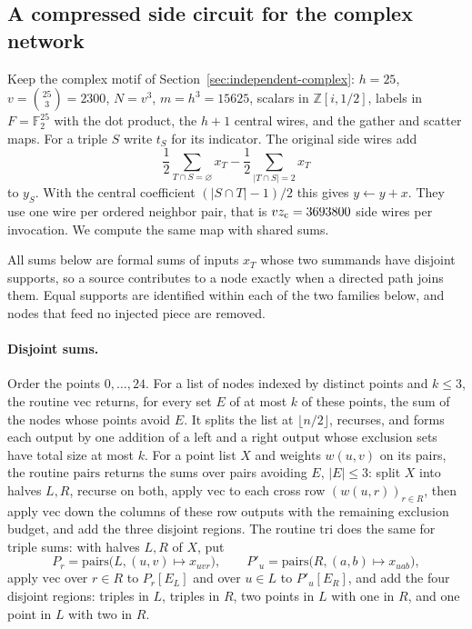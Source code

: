 \subsection{A compressed side circuit for the complex network}
\label{sec:complex-side-circuit}
Keep the complex motif of Section~\ref{sec:independent-complex}: $h=25$,
$v=\binom{25}3=2300$, $N=v^3$, $m=h^3=15625$, scalars in
$\mathbb Z[i,1/2]$, labels in $F=\mathbb F_2^{25}$ with the dot product, the
$h+1$ central wires, and the gather and scatter maps. For a triple $S$ write
$t_S$ for its indicator. The original side wires add
\begin{equation}\label{eq:complex-side-map}
 \frac12\sum_{T\cap S=\varnothing}x_T-\frac12\sum_{|T\cap S|=2}x_T
\end{equation}
to $y_S$. With the central coefficient $(|S\cap T|-1)/2$ this gives
$y\gets y+x$. They use one wire per ordered neighbor pair, that is
$vz_{\rm c}=3693800$ side wires per invocation. We compute the same map with
shared sums.

All sums below are formal sums of inputs $x_T$ whose two summands have
disjoint supports, so a source contributes to a node exactly when a directed
path joins them. Equal supports are identified within each of the two
families below, and nodes that feed no injected piece are removed.

\paragraph{Disjoint sums.}
Order the points $0,\ldots,24$. For a list of nodes indexed by distinct
points and $k\le3$, the routine $\mathrm{vec}$ returns, for every set $E$ of
at most $k$ of these points, the sum of the nodes whose points avoid $E$. It
splits the list at $\lfloor n/2\rfloor$, recurses, and forms each output by one
addition of a left and a right output whose exclusion sets have total size at
most $k$. For a point list $X$ and weights $w(u,v)$ on its pairs, the routine
$\mathrm{pairs}$ returns the sums over pairs avoiding $E$, $|E|\le3$: split $X$
into halves $L,R$, recurse on both, apply $\mathrm{vec}$ to each cross row
$(w(u,r))_{r\in R}$, then apply $\mathrm{vec}$ down the columns of these
row outputs with the remaining exclusion budget, and add the three disjoint
regions. The routine $\mathrm{tri}$ does the same for triple sums: with halves
$L,R$ of $X$, put
\[
 P_r=\mathrm{pairs}\bigl(L,(u,v)\mapsto x_{uvr}\bigr),\qquad
 P'_u=\mathrm{pairs}\bigl(R,(a,b)\mapsto x_{uab}\bigr),
\]
apply $\mathrm{vec}$ over $r\in R$ to $P_r[E_L]$ and over $u\in L$ to
$P'_u[E_R]$, and add the four disjoint regions: triples in $L$, triples in $R$,
two points in $L$ with one in $R$, and one point in $L$ with two in $R$.

